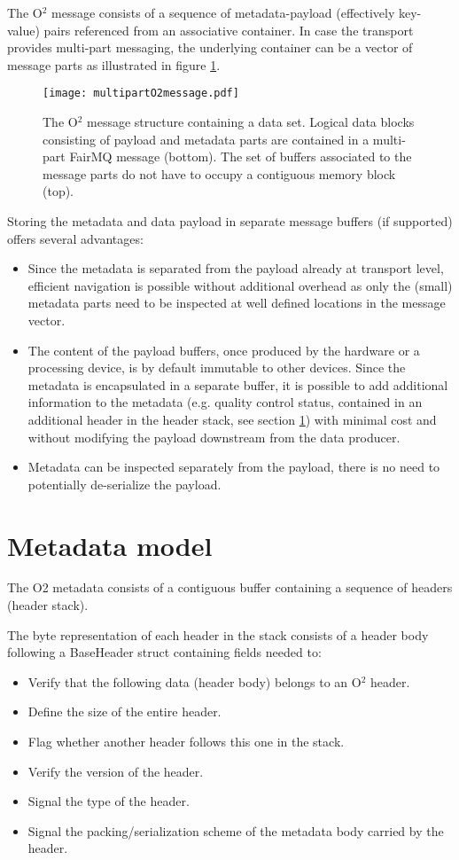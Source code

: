 \documentclass[a4paper,twoside]{article}
\def\O2{O$^2$}
\begin{document}
The \O2 message consists of a sequence of metadata-payload (effectively key-value) pairs referenced from an associative container. In case the transport provides multi-part messaging, the underlying container can be a vector of message parts as illustrated in figure \ref{fig:o2message}.

\begin{figure}[h]
  \centering
  \texttt{[image: multipartO2message.pdf]}
  \caption{The \O2 message structure containing a data set. Logical data blocks consisting of payload and metadata parts are contained in a multi-part FairMQ message (bottom). The set of buffers associated to the message parts do not have to occupy a contiguous memory block (top).}
  \label{fig:o2message} 
\end{figure}

Storing the metadata and data payload in separate message buffers (if supported) offers several advantages:
\begin{itemize}
  \item Since the metadata is separated from the payload already at transport level, efficient navigation is possible without additional overhead as only the (small) metadata parts need to be inspected at well defined locations in the message vector.
  \item The content of the payload buffers, once produced by the hardware or a processing device, is by default immutable to other devices. Since the metadata is encapsulated in a separate buffer, it is possible to add additional information to the metadata (e.g. quality control status, contained in an additional header in the header stack, see section \ref{sec:header}) with minimal cost and without modifying the payload downstream from the data producer.
  \item Metadata can be inspected separately from the payload, there is no need to potentially de-serialize the payload.
\end{itemize}

\section{Metadata model}\label{sec:header}

The O2 metadata consists of a contiguous buffer containing a sequence of headers (header stack).

The byte representation of each header in the stack consists of a header body following a BaseHeader struct containing fields needed to:
\begin{itemize}
  \item Verify that the following data (header body) belongs to an \O2 header.
  \item Define the size of the entire header.
  \item Flag whether another header follows this one in the stack.
  \item Verify the version of the header.
  \item Signal the type of the header.
  \item Signal the packing/serialization scheme of the metadata body carried by the header.
\end{itemize}
\end{document}
